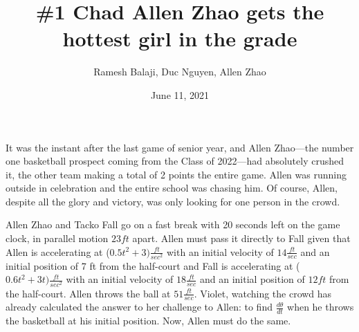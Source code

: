 \documentclass[xcolor={usenames, dvipsnames}]{beamer}
\title{\#1 Chad Allen Zhao gets the hottest girl in the grade}
\author{Ramesh Balaji, Duc Nguyen, Allen Zhao}
\date{June 11, 2021}
\begin{document}
\frame{\titlepage}

\begin{frame}
	It was the instant after the last game of senior year, and Allen Zhao—the number one basketball prospect coming from the Class of 2022—had absolutely crushed it, the other team making a total of 2 points the entire game. Allen was running outside in celebration and the entire school was chasing him. Of course, Allen, despite all the glory and victory, was only looking for one person in the crowd.
\end{frame}
\begin{frame}
    Allen Zhao and Tacko Fall go on a fast break with 20 seconds left on the game clock, in parallel
    motion $23 ft$ apart. 
Allen must pass it directly to Fall given that Allen is accelerating at ($0.5t^2+3)\frac{ft}{sec^2}$
with an initial velocity of $14 \frac{ft}{sec}$ and an initial position of 7 ft from the half-court and Fall is accelerating at ($0.6t^2+3t) \frac{ft}{sec^2}$
with an initial velocity of $18 \frac{ft}{sec}$ and an initial position of $12ft$ from the half-court. Allen throws the ball at 
$51 \frac{ft}{sec}$. Violet, watching the crowd has already calculated the answer to 
her challenge to Allen: to find $\frac{d\theta}{dt}$ when he throws the basketball at his
initial position. Now, Allen must do the same. 

\end{frame}
\end{document}
